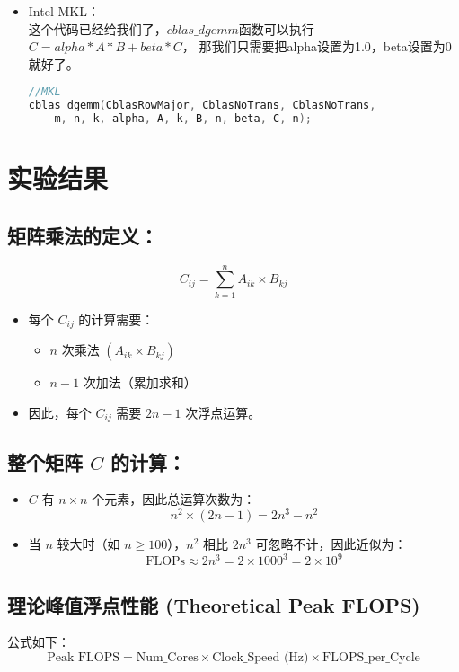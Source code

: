 \documentclass{SYSUReport}
\begin{document}
\begin{itemize}
\item   Intel MKL：\\
这个代码已经给我们了，$cblas\_dgemm$函数可以执行
$C=alpha*A*B+beta*C$，
那我们只需要把alpha设置为1.0，beta设置为0就好了。
\begin{lstlisting}[language=c++]
//MKL
cblas_dgemm(CblasRowMajor, CblasNoTrans, CblasNoTrans,
    m, n, k, alpha, A, k, B, n, beta, C, n);
\end{lstlisting}

\end{itemize}


\section{实验结果}
\subsection{矩阵乘法的定义：}

\[ C_{ij} = \sum_{k=1}^{n} A_{ik} \times B_{kj} \]

\begin{itemize}
    \item 每个 \( C_{ij} \) 的计算需要：
    \begin{itemize}
        \item \( n \) 次乘法 \( (A_{ik} \times B_{kj}) \)
        \item \( n-1 \) 次加法（累加求和）
    \end{itemize}
    \item 因此，每个 \( C_{ij} \) 需要 \( 2n-1 \) 次浮点运算。
\end{itemize}

\subsection{整个矩阵 \( C \) 的计算：}
\begin{itemize}
    \item \( C \) 有 \( n \times n \) 个元素，因此总运算次数为：
    \[ n^2 \times (2n-1) = 2n^3 - n^2 \]
    \item 当 \( n \) 较大时（如 \( n \geq 100 \)），\( n^2 \) 相比 \( 2n^3 \) 可忽略不计，因此近似为：
    \[ \text{FLOPs} \approx 2n^3=2×1000^3=2 \times 10^9 \]
\end{itemize}
\subsection{理论峰值浮点性能 (Theoretical Peak FLOPS)}
公式如下：
\[ \text{Peak FLOPS} = \text{Num\_Cores} \times \text{Clock\_Speed (Hz)} \times \text{FLOPS\_per\_Cycle} \]
\end{document}
